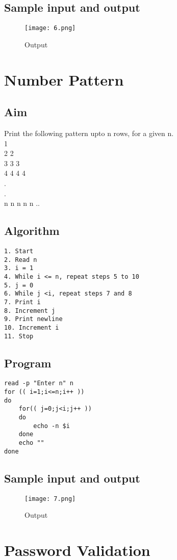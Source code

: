 \documentclass{article}
\begin{document}
\subsection{Sample input and output}
\begin{figure}[H]
    \centering
    \texttt{[image: 6.png]}
    \caption{Output}
    \label{fig:my_label2}
\end{figure}
\section{\Large Number Pattern}
\subsection{Aim}
Print the following pattern upto n rows, for a given n.\\
1\\
2 2\\
3 3 3\\
4 4 4 4\\
.\\
.\\
n n n n n ..\\
\subsection{Algorithm}
\begin{Verbatim}[tabsize = 4]
1. Start
2. Read n
3. i = 1
4. While i <= n, repeat steps 5 to 10
5. j = 0
6. While j <i, repeat steps 7 and 8
7. Print i
8. Increment j
9. Print newline
10. Increment i
11. Stop
\end{Verbatim}
\subsection{Program}
\begin{Verbatim}[tabsize = 4]
read -p "Enter n" n
for (( i=1;i<=n;i++ ))
do
    for(( j=0;j<i;j++ ))
    do
        echo -n $i
    done
    echo ""
done
\end{Verbatim}
\subsection{Sample input and output}
\thispagestyle{third}
\begin{figure}[H]
    \centering
    \texttt{[image: 7.png]}
    \caption{Output}
    \label{fig:my_label2}
\end{figure}
\section{\Large Password Validation}
\end{document}
